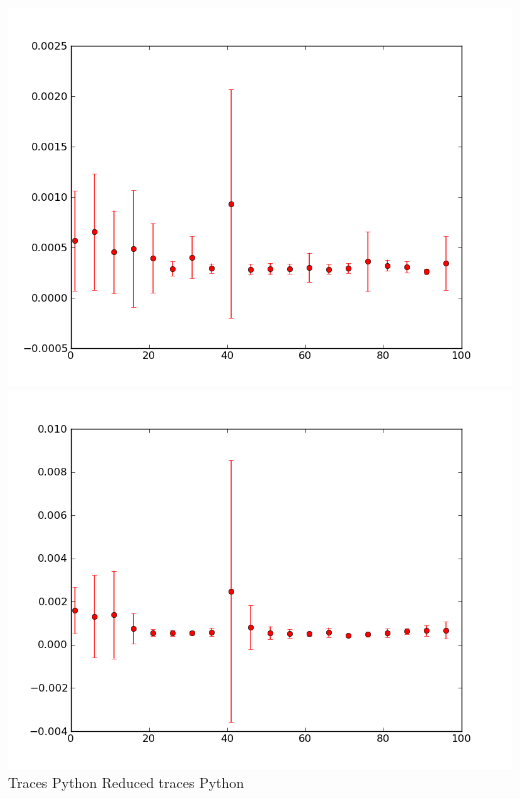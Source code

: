 \documentclass[10pt]{article}
\begin{document}
\begin{center}
\includegraphics[scale=0.4]{../graphs/CRP_mixture/CRP-mixture-model-collapsed-traces-py-time.png} 
\includegraphics[scale=0.4]{../graphs/CRP_mixture/CRP-mixture-model-collapsed-reduced-traces-py-time.png} \\
Traces Python \qquad \qquad \qquad\qquad\qquad\qquad \qquad Reduced traces Python \\

\end{center}
\end{document}

